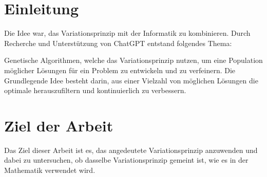 %
%
%
%
\section{Einleitung
\label{variationsprinzip_algorithmen:section:introduction}}
Die Idee war, das Variationsprinzip mit der Informatik zu kombinieren. 
Durch Recherche und Unterstützung von ChatGPT entstand folgendes Thema:

\begin{displayquote}
    Genetische Algorithmen, welche das Variationsprinzip nutzen, um eine Population 
    möglicher Lösungen für ein Problem zu entwickeln und zu verfeinern. 
    Die Grundlegende Idee besteht darin, aus einer Vielzahl von möglichen Lösungen 
    die optimale herauszufiltern und kontinuierlich zu verbessern.
\end{displayquote}

\section{Ziel der Arbeit
\label{variationsprinzip_algorithmen:section:goal}}
Das Ziel dieser Arbeit ist es, das angedeutete Variationsprinzip anzuwenden und dabei 
zu untersuchen, ob dasselbe Variationsprinzip gemeint ist, wie es in der Mathematik 
verwendet wird.
